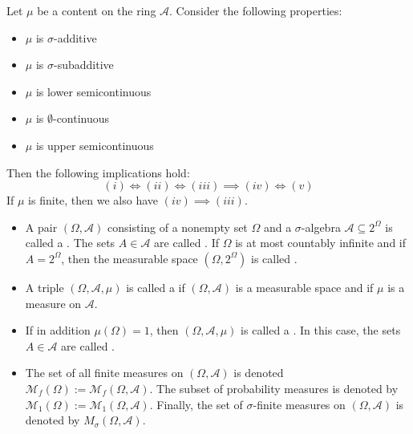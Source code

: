 \documentclass[12pt, a4paper, oneside, openright, titlepage]{book}
\begin{document}
\begin{thm}
    Let $\mu$ be a content on the ring $\mathcal{A}$. Consider the following properties: \begin{itemize}
        \item $\mu$ is $\sigma$-additive
        \item $\mu$ is $\sigma$-subadditive
        \item $\mu$ is lower semicontinuous 
        \item $\mu$ is $\emptyset$-continuous 
        \item $\mu$ is upper semicontinuous
    \end{itemize}
    Then the following implications hold: \begin{equation*}
        (i) \iff (ii) \iff (iii) \implies (iv) \iff (v)
    \end{equation*}
    If $\mu$ is finite, then we also have $(iv) \implies (iii)$.
\end{thm}

\begin{defn}
    \leavevmode
    \begin{itemize}
        \item A pair $(\Omega,\mathcal{A})$ consisting of a nonempty set $\Omega$ and a $\sigma$-algebra $\mathcal{A}\subseteq 2^{\Omega}$ is called a . The sets $A \in \mathcal{A}$ are called . If $\Omega$ is at most countably infinite and if $A = 2^{\Omega}$, then the measurable space $(\Omega,2^{\Omega})$ is called .
        \item A triple $(\Omega,\mathcal{A},\mu)$ is called a  if $(\Omega,\mathcal{A})$ is a measurable space and if $\mu$ is a measure on $\mathcal{A}$.
        \item If in addition $\mu(\Omega) = 1$, then $(\Omega,\mathcal{A},\mu)$ is called a . In this case, the sets $A \in \mathcal{A}$ are called .
        \item The set of all finite measures on $(\Omega,\mathcal{A})$ is denoted $\mathcal{M}_f(\Omega) := \mathcal{M}_f(\Omega,\mathcal{A})$. The subset of probability measures is denoted by $\mathcal{M}_1(\Omega) := \mathcal{M}_1(\Omega, \mathcal{A})$. Finally, the set of $\sigma$-finite measures on $(\Omega,\mathcal{A})$ is denoted by $M_{\sigma}(\Omega,\mathcal{A})$.
    \end{itemize}
\end{defn}
\end{document}
